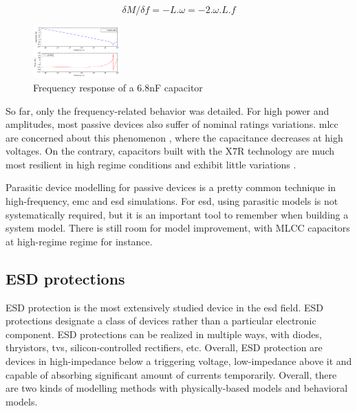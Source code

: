 \begin{equation}
\delta M/ \delta f =  -L.\omega = -2.\omega .L.f
\label{eq:inductor-impedance}
\end{equation}

\begin{figure}[!h]
  \centering
  \includegraphics[width=0.3\textwidth]{src/2/figures/capa_hf_response.png}
  \caption{Frequency response of a 6.8nF capacitor}
  \label{fig:frequency-response-capa}
\end{figure}


So far, only the frequency-related behavior was detailed.
For high power and amplitudes, most passive devices also suffer of nominal ratings variations.
\gls{mlcc} are concerned about this phenomenon \cite{capa-esd-cz}, where the capacitance decreases at high voltages.
On the contrary, capacitors built with the X7R technology are much most resilient in high regime conditions and exhibit little variations \cite{fabien-capas}.

Parasitic device modelling for passive devices is a pretty common technique in high-frequency, \gls{emc} and \gls{esd} simulations.
For \gls{esd}, using parasitic models is not systematically required, but it is an important tool to remember when building a system model.
There is still room for model improvement, with MLCC capacitors at high-regime regime for instance.

\subsection{ESD protections}
\label{esd-protection-modelling}

%
ESD protection is the most extensively studied device in the \gls{esd} field.
ESD protections designate a class of devices rather than a particular electronic component.
ESD protections can be realized in multiple ways, with diodes, thryistors, \gls{tvs}, silicon-controlled rectifiers, etc.
Overall, ESD protection are devices in high-impedance below a triggering voltage, low-impedance above it and capable of absorbing significant amount of currents temporarily.
Overall, there are two kinds of modelling methods with physically-based models and behavioral models.

